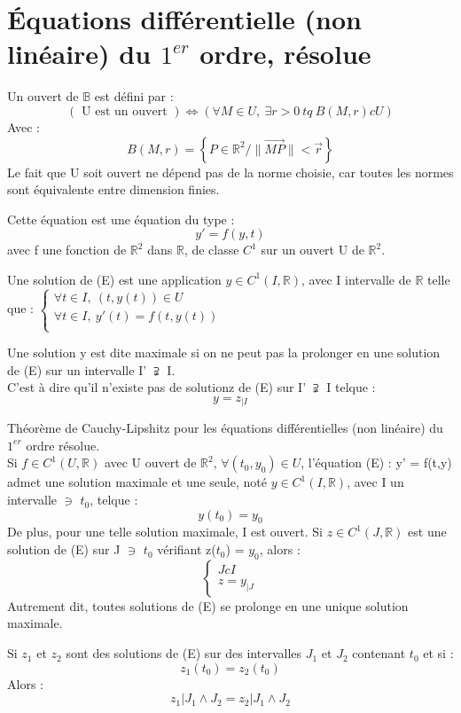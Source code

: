 \section{Équations différentielle (non linéaire) du $1^{er}$ ordre, résolue}
\begin{de}
Un ouvert de $\mathbb{B}$ est défini par : 
$$(\mbox{ U est un ouvert }) \Leftrightarrow ( \forall M \in U,~ \exists r > 0~ tq~ B(M,r) c U )$$
Avec : 
$$B(M,r) = \left\lbrace P \in \mathbb{R}^2 / \parallel \overrightarrow{MP} \parallel < \overrightarrow{r}\right\rbrace $$
Le fait que U soit ouvert ne dépend pas de la norme choisie, car toutes les normes sont équivalente entre dimension finies.
\end{de}
Cette équation est une équation du type : 
$$y' = f(y,t) $$
avec f une fonction de $\mathbb{R}^2$ dans $\mathbb{R}$, de classe $C^1$ sur un ouvert U de $\mathbb{R}^2$.
\begin{de}
Une solution de (E) est une application $y \in C^1(I,\mathbb{R})$, avec I intervalle de $\mathbb{R}$ telle que : 
$\begin{cases}
 	\forall t \in I,~ (t,y(t)) \in U \\
        \forall t \in I,~ y'(t) = f(t,y(t)) \\
\end{cases}$
\end{de}
\begin{de}
Une solution y est dite maximale si on ne peut pas la prolonger en une solution de (E) sur un intervalle I' $\supsetneqq$ I.\\
C'est à dire qu'il n'existe pas de solutionz de (E) sur I' $\supsetneqq$ I telque :
$$y = z_{|I}$$
\end{de}
\begin{theo}
Théorème de Cauchy-Lipshitz pour les équations différentielles (non linéaire) du $1^{er}$ ordre résolue.\\
Si $f \in C^1(U,\mathbb{R})$ avec U ouvert de $\mathbb{R}^2$, $\forall(t_0,y_0) \in U$, l'équation (E) : y' = f(t,y) admet une solution maximale et une seule, noté $y \in C^1(I,\mathbb{R})$, avec I un intervalle $\ni$ $t_0$, telque :
$$y(t_0) = y_0$$
De plus, pour une telle solution maximale, I est ouvert. Si $z \in C^1(J,\mathbb{R})$ est une solution de (E) sur J $\ni$ $t_0$ vérifiant z($t_0$) = $y_0$, alors : 
$$\begin{cases}
   J c I \\
   z = y_{|J}
  \end{cases}
$$
Autrement dit, toutes solutions de (E) se prolonge en une unique solution maximale.
\end{theo}
\begin{coro}
 Si $z_1$ et $z_2$ sont des solutions de (E) sur des intervalles $J_1$ et $J_2$ contenant $t_0$ et si : 
$$z_1(t_0) = z_2(t_0)$$
Alors : 
$$z_1{|J_{1}\wedge J_{2}} = z_2{|J_{1}\wedge J_{2}}$$
\end{coro}
